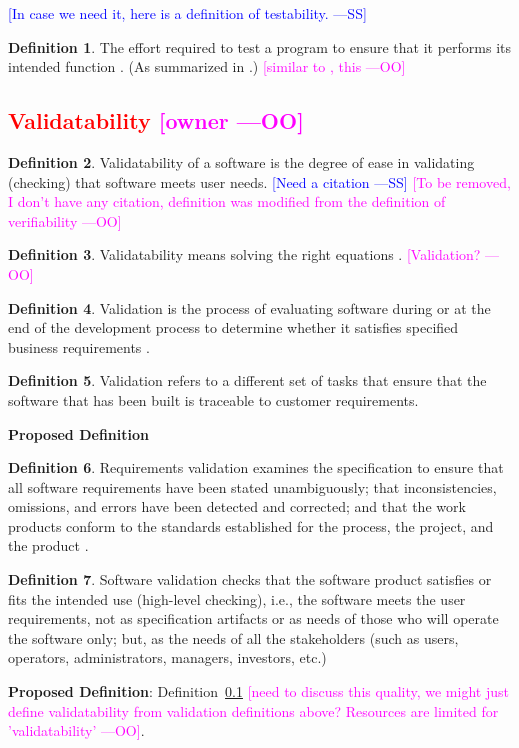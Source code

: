 \documentclass[letterpaper,cleveref]{lipics-v2019}
\newcommand{\authornote}[3]{\textcolor{#1}{[#3 ---#2]}}
\newcommand{\authornote}[3]{}
\newcommand{\wss}[1]{\authornote{blue}{SS}{#1}} %
\newcommand{\oo}[1]{\authornote{magenta}{OO}{#1}} %
\newcommand{\notdone}[1]{\textcolor{red}{#1}}
\theoremstyle{definition}
\newtheorem{defn}{Definition}
\begin{document}
\wss{In case we need it, here is a definition of testability.}

\begin{defn}
	The effort required to test a program to ensure that it performs its
	intended function \citep{McCallEtAl1977}. (As summarized in
	\citet{VanVliet2000}.) \oo{similar to \citep{pressman2005software}, this}
\end{defn}


\subsection{\notdone{Validatability} \oo{owner}}

\begin{defn}
	Validatability of a software is the degree of ease in validating (checking)
	that software meets user needs. \wss{Need a citation} \oo{To be removed, I don't have any citation, definition was modified from the definition of verifiability}
\end{defn}

\begin{defn}
	Validatability means solving the right equations
	\citep[p.~23]{Roache1998}.
	\oo{Validation?}
\end{defn}

\begin{defn} \label{Validatability_Selected}
   Validation is the process of evaluating software during or at the end of the development
   process to determine whether it satisfies specified business requirements \citep{softwaretestingfundamentals}.

\end{defn}

\begin{defn}
	Validation refers to a different set
	of tasks that ensure that the software that has been built is traceable to customer requirements.
\end{defn}
\noindent \textbf{Proposed Definition}

\begin{defn}
	Requirements validation examines the specification to ensure that all
	software requirements have been stated unambiguously; that inconsistencies, omissions, and errors have been detected and corrected; and that the work products conform to the standards established for the process, the project, and the product \citep{pressman2005software}.
\end{defn}

\begin{defn}
    Software validation checks that the software product satisfies or fits the intended use (high-level checking), i.e., the software meets the user requirements, not as specification artifacts or as needs of those who will operate the software only; but, as the needs of all the stakeholders (such as users, operators, administrators, managers, investors, etc.) \citep{WikipediaVnV}
\end{defn}
\noindent \textbf{Proposed Definition}: Definition~\ref{} \oo{need to discuss this quality, we might just define validatability from validation definitions above? Resources are limited for 'validatability'}.
\end{document}

